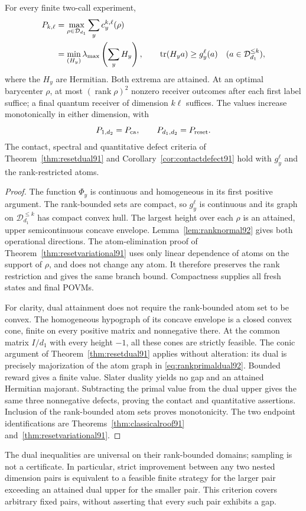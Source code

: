 \begin{theorem}\label{thm:rankroof92}
For every finite two-call experiment,
\begin{equation}\label{eq:rankprimaldual92}
\begin{split}
 P_{k,\ell}&=\max_{\rho\in\mathcal D_{d_1}}
                       \sum_yc_y^{k,\ell}(\rho)\\
 &=\min_{(H_y)}\lambda_{\max}\left(\sum_yH_y\right),\qquad
 \operatorname{tr}(H_ya)\ge g_y^\ell(a)\quad(a\in\mathcal D_{d_1}^{\le k}),
\end{split}
\end{equation}
where the $H_y$ are Hermitian.  Both extrema are attained.  At an
optimal barycenter $\rho$, at most $(\operatorname{rank}\rho)^2$
nonzero receiver outcomes after each first label suffice; a final
quantum receiver of dimension $k\ell$ suffices.
The values increase monotonically in either dimension, with
\[
 P_{1,d_2}=P_{\rm ca},\qquad P_{d_1,d_2}=P_{\rm reset}.
\]
The contact, spectral and quantitative defect criteria of
Theorem~\ref{thm:resetdual91} and Corollary~\ref{cor:contactdefect91}
hold with $g_y^\ell$ and the rank-restricted atoms.
\end{theorem}
\begin{proof}
The function $\Phi_y$ is continuous and homogeneous in its first
positive argument.  The rank-bounded sets are compact, so
$g_y^\ell$ is continuous and its graph on
$\mathcal D_{d_1}^{\le k}$ has compact convex hull.
The largest height over each $\rho$ is an attained, upper
semicontinuous concave envelope.  Lemma~\ref{lem:ranknormal92} gives
both operational directions.  The atom-elimination proof of
Theorem~\ref{thm:resetvariational91} uses only linear dependence of
atoms on the support of $\rho$, and does not change any atom.  It
therefore preserves the rank restriction and gives the same branch
bound.  Compactness supplies all fresh states and final POVMs.

For clarity, dual attainment does not require the rank-bounded atom
set to be convex.  The homogeneous hypograph of its concave envelope
is a closed convex cone, finite on every positive matrix and
nonnegative there.  At the common matrix $I/d_1$ with every height
$-1$, all these cones are strictly feasible.  The conic argument of
Theorem~\ref{thm:resetdual91} applies without alteration: its dual is
precisely majorization of the atom graph in \eqref{eq:rankprimaldual92}.
Bounded reward gives a finite value.  Slater duality yields no gap and
an attained Hermitian majorant.  Subtracting the primal value from the
dual upper gives the same three nonnegative defects, proving the
contact and quantitative assertions.  Inclusion of the rank-bounded
atom sets proves monotonicity.  The two endpoint identifications are
Theorems~\ref{thm:classicalroof91} and~\ref{thm:resetvariational91}.
\end{proof}
The dual inequalities are universal on their rank-bounded domains;
sampling is not a certificate.  In particular, strict improvement
between any two nested dimension pairs is equivalent to a feasible
finite strategy for the larger pair exceeding an attained dual upper
for the smaller pair.  This criterion covers arbitrary fixed pairs,
without asserting that every such pair exhibits a gap.

